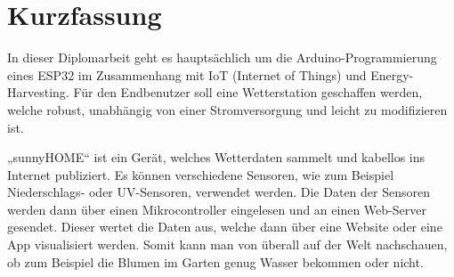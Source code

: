 

\chapter*{Kurzfassung}



In dieser Diplomarbeit geht es hauptsächlich um die Arduino-Programmierung eines ESP32 im Zusammenhang mit IoT (Internet of Things) und Energy-Harvesting. Für den Endbenutzer soll eine Wetterstation geschaffen werden, welche robust, unabhängig von einer Stromversorgung und leicht zu modifizieren ist. 

„sunnyHOME“ ist ein Gerät, welches Wetterdaten sammelt und kabellos ins Internet publiziert. Es können verschiedene Sensoren, wie zum Beispiel Niederschlags- oder UV-Sensoren, verwendet werden. Die Daten der Sensoren werden dann über einen Mikrocontroller eingelesen und an einen Web-Server gesendet. Dieser wertet die Daten aus, welche dann über eine Website oder eine App visualisiert werden. Somit kann man von überall auf der Welt nachschauen, ob zum Beispiel die Blumen im Garten genug Wasser bekommen oder nicht.   


